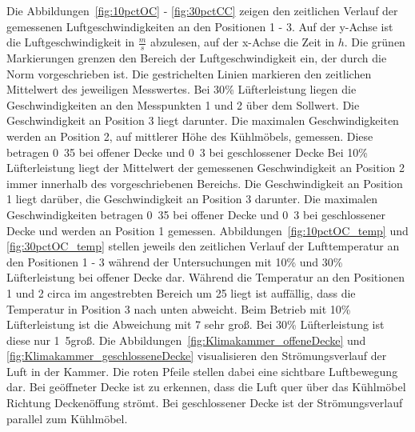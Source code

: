 Die Abbildungen~\ref{fig:10pctOC} - \ref{fig:30pctCC} zeigen den zeitlichen Verlauf der gemessenen Luftgeschwindigkeiten an den Positionen 1 - 3. Auf der y-Achse ist die Luftgeschwindigkeit in $\frac{m}{s}$ abzulesen, auf der x-Achse die Zeit in $h$. Die grünen Markierungen grenzen den Bereich der Luftgeschwindigkeit ein, der durch die Norm vorgeschrieben ist. Die gestrichelten Linien markieren den zeitlichen Mittelwert des jeweiligen Messwertes. \newline
Bei \unit{30}{\%} Lüfterleistung liegen die Geschwindigkeiten an den Messpunkten 1 und 2 über dem Sollwert. Die Geschwindigkeit an Position 3 liegt darunter. Die maximalen Geschwindigkeiten werden an Position 2, auf mittlerer Höhe des Kühlmöbels, gemessen. Diese betragen \unit{0.35}{\metre\per\second} bei offener Decke und \unit{0.3}{\metre\per\second} bei geschlossener Decke 
Bei \unit{10}{\%} Lüfterleistung liegt der Mittelwert der gemessenen Geschwindigkeit an Position 2 immer innerhalb des vorgeschriebenen Bereichs. Die Geschwindigkeit an Position 1 liegt darüber, die Geschwindigkeit an Position 3 darunter. Die maximalen Geschwindigkeiten betragen \unit{0.35}{\metre\per\second} bei offener Decke und \unit{0.3}{\metre\per\second} bei geschlossener Decke und werden an Position 1 gemessen. \newline
Abbildungen~\ref{fig:10pctOC_temp} und \ref{fig:30pctOC_temp} stellen jeweils den zeitlichen Verlauf der Lufttemperatur an den Positionen 1 - 3 während der Untersuchungen mit \unit{10}{\%} und \unit{30}{\%} Lüfterleistung bei offener Decke dar.
Während die Temperatur an den Positionen 1 und 2 circa im angestrebten Bereich um \unit{25}{\celsius} liegt ist auffällig, dass die Temperatur in Position 3 nach unten abweicht. Beim Betrieb mit \unit{10}{\%} Lüfterleistung ist die Abweichung mit \unit{7}{\kelvin} sehr groß. Bei \unit{30}{\%} Lüfterleistung ist diese nur \unit{1.5}{\kelvin}groß. \newline
Die Abbildungen~\ref{fig:Klimakammer_offeneDecke} und \ref{fig:Klimakammer_geschlosseneDecke} visualisieren den Strömungsverlauf der Luft in der Kammer. Die roten Pfeile stellen dabei eine sichtbare Luftbewegung dar.
Bei geöffneter Decke ist zu erkennen, dass die Luft quer über das Kühlmöbel Richtung Deckenöffung strömt. Bei geschlossener Decke ist der Strömungsverlauf parallel zum Kühlmöbel.




